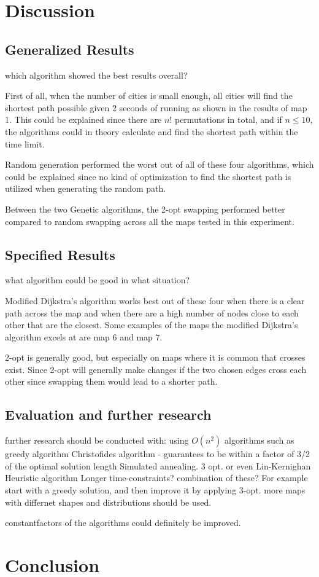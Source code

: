 \documentclass{article}
\begin{document}
\newpage


\section{Discussion}\label{sec4}

\subsection{Generalized Results}\label{subsec1}
which algorithm showed the best results overall?

First of all, when the number of cities is small enough, all cities will find the shortest path possible given 2 seconds of running as shown in the results of map 1. This could be explained since there are $n!$ permutations in total, and if $n\leq 10$, the algorithms could in theory calculate and find the shortest path within the time limit.

Random generation performed the worst out of all of these four algorithms, which could be explained since no kind of optimization to find the shortest path is utilized when generating the random path. 

Between the two Genetic algorithms, the 2-opt swapping performed better compared to random swapping across all the maps tested in this experiment. 

\subsection{Specified Results }\label{subsec2}
what algorithm could be good in what situation?

Modified Dijkstra's algorithm works best out of these four when there is a clear path across the map and when there are a high number of nodes close to each other that are the closest. Some examples of the maps the modified Dijkstra's algorithm excels at are map 6 and map 7. 

2-opt is generally good, but especially on maps where it is common that crosses exist. Since 2-opt will generally make changes if the two chosen edges cross each other since swapping them would lead to a shorter path.


\subsection{Evaluation and further research}\label{subsec3}

further research should be conducted with:
using $O(n^2)$ algorithms such as 
greedy algorithm
Christofides algorithm - guarantees to be within a factor of 3/2 of the optimal solution length \cite{Christofides}
Simulated annealing.
3 opt. or even Lin-Kernighan Heuristic algorithm
Longer time-constraints?
combination of these? For example start with a greedy solution, and then improve it by applying 3-opt.
more maps with differnet shapes and distributions should be used.

constantfactors of the algorithms could definitely be improved.
\section{Conclusion}\label{sec5}






\newpage

 \label{sec6}
\end{document}
